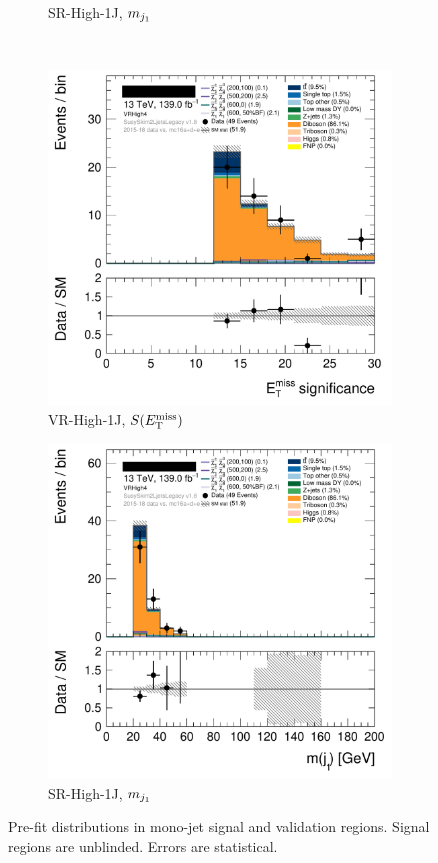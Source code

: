 \begin{figure}[tp]
\begin{subfigure}{0.495\textwidth}
\caption{SR-High-1J, $m_{j_1}$}
\end{subfigure}
\\[0.5em]
\begin{subfigure}{0.495\textwidth}
\centering
\includegraphics[width=\textwidth]{figures/2ljets_def_met_Sign_VRHigh4.png}
\caption{VR-High-1J, $S(E_\mathrm{T}^\mathrm{miss})$}
\end{subfigure}
\hfill
\begin{subfigure}{0.495\textwidth}
\centering
\includegraphics[width=\textwidth]{figures/2ljets_def_mjetone_VRHigh4.png}
\caption{SR-High-1J, $m_{j_1}$}
\end{subfigure}
\caption[
Pre-fit distributions in mono-jet signal and validation regions
]{%
Pre-fit distributions in mono-jet signal and validation regions.
Signal regions are unblinded.
Errors are statistical.
}
\label{fig:2ljets_high_1J_region}
\end{figure}
